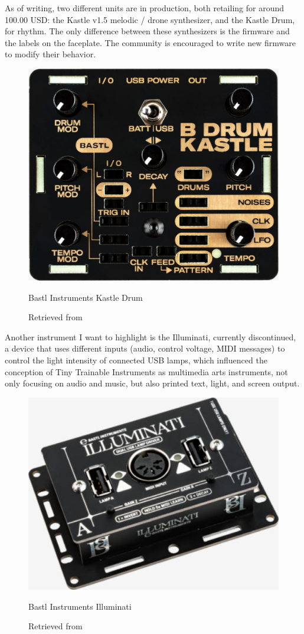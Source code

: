 As of writing, two different units are in production, both retailing for around 100.00 USD: the Kastle v1.5 melodic / drone synthesizer, and the Kastle Drum, for rhythm. The only difference between these synthesizers is the firmware and the labels on the faceplate. The community is encouraged to write new firmware to modify their behavior. 

\begin{figure}[ht]
  \centering
  \includegraphics[width=0.75\linewidth,height=0.25\textheight,keepaspectratio]{images/bastl-kastle-drum.jpg}
  \caption{Bastl Instruments Kastle Drum}
  \caption*{Retrieved from \cite{website-bastl-instruments-current}}
  \label{fig:bastl-kastle-drum}
\end{figure}

Another instrument I want to highlight is the Illuminati, currently discontinued, a device that uses different inputs (audio, control voltage, \acrshort{MIDI} messages) to control the light intensity of connected USB lamps, which influenced the conception of Tiny Trainable Instruments as multimedia arts instruments, not only focusing on audio and music, but also printed text, light, and screen output.

\begin{figure}[ht]
  \centering
  \includegraphics[width=0.75\linewidth,height=0.25\textheight,keepaspectratio]{images/bastl-illuminati.jpg}
  \caption{Bastl Instruments Illuminati}
  \caption*{Retrieved from \cite{website-bastl-instruments-current}}
  \label{fig:bastl-illuminati}
\end{figure}

